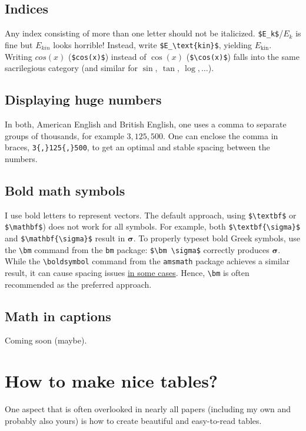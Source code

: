 \subsection{Indices}
Any index consisting of more than one letter should not be italicized. \verb|$E_k$|/$E_k$ is fine but $E_{kin}$ looks horrible! Instead, write \verb|$E_\text{kin}$|, yielding $E_\text{kin}$.
Writing $cos(x)$ (\verb|$cos(x)$|) instead of $\cos(x)$ (\verb|$\cos(x)$|) falls into the same sacrilegious category (and similar for $\sin,~\tan,~\log,\ldots$).

\subsection{Displaying huge numbers}
In both, American English and British English, one uses a comma to separate groups of thousands, for example $3{,}125{,}500$. One can enclose the comma in braces, \verb|3{,}125{,}500|, to get an optimal and stable spacing between the numbers. 

\subsection{Bold math symbols}
I use bold letters to represent vectors. The default approach, using \verb|$\textbf$| or \verb|$\mathbf$|) does not work for all symbols. For example, both \verb|$\textbf{\sigma}$| and \verb|$\mathbf{\sigma}$| result in $\mathbf{\sigma}$. To properly typeset bold Greek symbols, use the \verb|\bm| command from the \verb|bm| package: \verb|$\bm \sigma$| correctly produces $\bm \sigma$. While the \verb|\boldsymbol| command from the \verb|amsmath| package achieves a similar result, it can cause spacing issues \href{https://latex.org/forum/viewtopic.php?t=26738}{in some cases}. Hence, \verb|\bm| is often recommended as the preferred approach.


\subsection{Math in captions}
Coming soon (maybe).

\section{How to make nice tables?}
One aspect that is often overlooked in nearly all papers (including my own and probably also yours) is how to create beautiful and easy-to-read tables.

